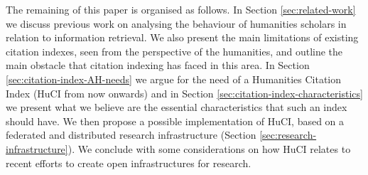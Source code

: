 The remaining of this paper is organised as follows. In Section \ref{sec:related-work} we discuss previous work on analysing the behaviour of humanities scholars in relation to information retrieval. We also present the main limitations of existing citation indexes, seen from the perspective of the humanities, and outline the main obstacle that citation indexing has faced in this area. In Section \ref{sec:citation-index-AH-needs} we argue for the need of a Humanities Citation Index (HuCI from now onwards) and in Section \ref{sec:citation-index-characteristics} we present what we believe are the essential characteristics that such an index should have. We then propose a possible implementation of HuCI, based on a federated and distributed research infrastructure (Section \ref{sec:research-infrastructure}). We conclude with some considerations on how HuCI relates to recent efforts to create open infrastructures for research.